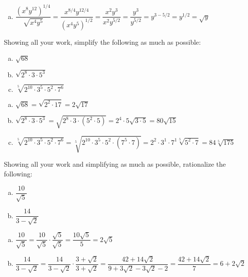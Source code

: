 \documentclass[12pt,letterpaper]{exam}
\begin{document}
\begin{questions}
\begin{enumerate}[(a)]
\item $\dfrac{(x^8 y^{12})^{1/4}}{\sqrt{x^4 y^5}}= \dfrac{x^{8/4} y^{12/4}}{(x^4 y^5)^{1/2}}= \dfrac{x^2 y^3}{x^2 y^{5/2}}= \dfrac{y^3}{y^{5/2}}= y^{3 - 5/2}= y^{1/2}= \sqrt{y}$
\end{enumerate}



\newpage
\question[10] Showing all your work, simplify the following as much as possible:
	\begin{enumerate}[(a)]
	\item $\sqrt{68}$
	\item $\sqrt{2^8 \cdot 3 \cdot 5^3}$
	\item $\sqrt[5]{2^{10} \cdot 3^5 \cdot 5^2 \cdot 7^6}$
	\end{enumerate} \pspace

\sol 
\begin{enumerate}[(a)]
\item $\sqrt{68}= \sqrt{2^2 \cdot 17}= 2 \sqrt{17}$ \pspace

\item $\sqrt{2^8 \cdot 3 \cdot 5^3}= \sqrt{2^8 \cdot 3 \cdot (5^2 \cdot 5)}= 2^4 \cdot 5 \sqrt{3 \cdot 5}= 80 \sqrt{15}$ \pspace

\item $\sqrt[5]{2^{10} \cdot 3^5 \cdot 5^2 \cdot 7^6}= \sqrt[5]{2^{10} \cdot 3^5 \cdot 5^2 \cdot (7^5 \cdot 7)}= 2^2 \cdot 3^1 \cdot 7^1 \sqrt[5]{5^2 \cdot 7}= 84 \sqrt[5]{175}$
\end{enumerate}



\newpage
\question[10] Showing all your work and simplifying as much as possible, rationalize the following:
	\begin{enumerate}[(a)] \itemsep=0.3cm
	\item $\dfrac{10}{\sqrt{5}}$
	\item $\dfrac{14}{3 - \sqrt{2}}$
	\end{enumerate} \pspace

\sol
\begin{enumerate}[(a)]
\item $\dfrac{10}{\sqrt{5}}= \dfrac{10}{\sqrt{5}} \cdot \dfrac{\sqrt{5}}{\sqrt{5}}= \dfrac{10 \sqrt{5}}{5}= 2 \sqrt{5}$ \pspace

\item $\dfrac{14}{3 - \sqrt{2}}= \dfrac{14}{3 - \sqrt{2}} \cdot \dfrac{3 + \sqrt{2}}{3 + \sqrt{2}}= \dfrac{42 + 14 \sqrt{2}}{9 + 3\sqrt{2} - 3\sqrt{2} - 2}= \dfrac{42 + 14 \sqrt{2}}{7}= 6 + 2 \sqrt{2}$
\end{enumerate}




\end{questions}
\end{document}
